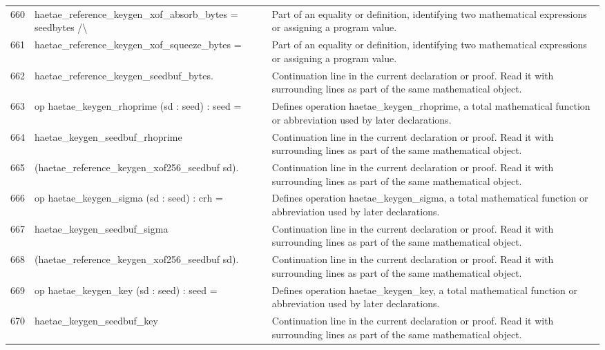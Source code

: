 \documentclass[10pt]{article}
\begin{document}
\begin{longtable}{r L{0.53\textwidth} L{0.37\textwidth}}
660 & {\ttfamily\scriptsize   haetae\_reference\_keygen\_xof\_absorb\_bytes = seedbytes /\textbackslash{}} & Part of an equality or definition, identifying two mathematical expressions or assigning a program value. \\
661 & {\ttfamily\scriptsize   haetae\_reference\_keygen\_xof\_squeeze\_bytes =} & Part of an equality or definition, identifying two mathematical expressions or assigning a program value. \\
662 & {\ttfamily\scriptsize     haetae\_reference\_keygen\_seedbuf\_bytes.} & Continuation line in the current declaration or proof.  Read it with surrounding lines as part of the same mathematical object. \\
663 & {\ttfamily\scriptsize op haetae\_keygen\_rhoprime (sd : seed) : seed =} & Defines operation haetae\_keygen\_rhoprime, a total mathematical function or abbreviation used by later declarations. \\
664 & {\ttfamily\scriptsize   haetae\_keygen\_seedbuf\_rhoprime} & Continuation line in the current declaration or proof.  Read it with surrounding lines as part of the same mathematical object. \\
665 & {\ttfamily\scriptsize     (haetae\_reference\_keygen\_xof256\_seedbuf sd).} & Continuation line in the current declaration or proof.  Read it with surrounding lines as part of the same mathematical object. \\
666 & {\ttfamily\scriptsize op haetae\_keygen\_sigma (sd : seed) : crh =} & Defines operation haetae\_keygen\_sigma, a total mathematical function or abbreviation used by later declarations. \\
667 & {\ttfamily\scriptsize   haetae\_keygen\_seedbuf\_sigma} & Continuation line in the current declaration or proof.  Read it with surrounding lines as part of the same mathematical object. \\
668 & {\ttfamily\scriptsize     (haetae\_reference\_keygen\_xof256\_seedbuf sd).} & Continuation line in the current declaration or proof.  Read it with surrounding lines as part of the same mathematical object. \\
669 & {\ttfamily\scriptsize op haetae\_keygen\_key (sd : seed) : seed =} & Defines operation haetae\_keygen\_key, a total mathematical function or abbreviation used by later declarations. \\
670 & {\ttfamily\scriptsize   haetae\_keygen\_seedbuf\_key} & Continuation line in the current declaration or proof.  Read it with surrounding lines as part of the same mathematical object. \\

\end{longtable}
\end{document}
